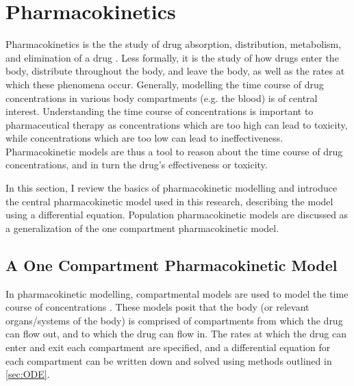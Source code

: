 \section{Pharmacokinetics} \label{PKPD}

Pharmacokinetics is the the study of drug absorption, distribution, metabolism, and elimination of a drug \cite{rosenbaum2016basic}.  Less formally,  it is the study of how drugs enter the body, distribute throughout the body, and leave the body, as well as the rates at which these phenomena occur.  Generally, modelling the time course of drug concentrations in various body compartments (e.g. the blood) is of central interest.  Understanding the time course of concentrations is important to pharmaceutical therapy as concentrations which are too high can lead to toxicity, while concentrations which are too low can lead to ineffectiveness.  Pharmacokinetic models are thus a tool to reason about the time course of drug concentrations, and in turn the drug's effectiveness or toxicity.

In this section, I review the basics of pharmacokinetic modelling and introduce the central pharmacokinetic model used in this research, describing the model using a differential equation.  Population pharmacokinetic models are discussed as a generalization of the one compartment pharmacokinetic model.


\subsection{A One Compartment Pharmacokinetic Model} 

In pharmacokinetic modelling, compartmental models are used to model the time course of concentrations \cite{rosenbaum2016basic}. These models posit that the body (or relevant organs/systems of the body) is comprised of compartments from which the drug can flow out, and to which the drug can flow in. The rates at which the drug can enter and exit each compartment are specified, and a differential equation for each compartment can be written down and solved using methods outlined in \cref{sec:ODE}.

